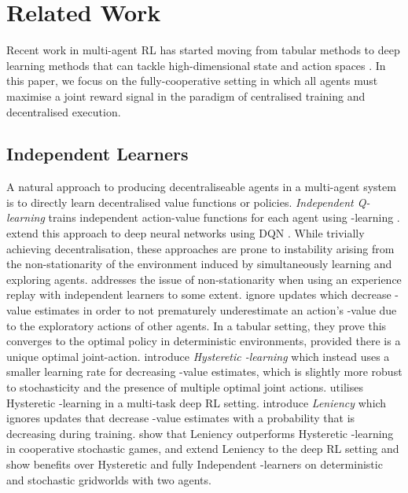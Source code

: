 \documentclass[twoside,11pt]{article}
\renewcommand{\cite}{\citep}
\begin{document}
 \section{Related Work}
\label{sec:related}

Recent work in multi-agent RL has started moving from 
tabular methods \cite{yang_multiagent_2004, busoniu_comprehensive_2008} to deep learning methods that can tackle
high-dimensional state and action spaces \cite{tampuu_multiagent_2015,foerster_counterfactual_2017,peng_multiagent_2017, de_witt_multi-agent_2018}.
In this paper, we 
focus on the fully-cooperative setting in which all agents must maximise a joint reward signal in the paradigm of centralised training and decentralised execution.  

\subsection{Independent Learners}
A natural approach to producing decentraliseable agents in a multi-agent system 
is to directly learn decentralised value functions or policies. 
\emph{Independent Q-learning} \cite{tan_multi-agent_1993} trains independent
action-value functions for each agent using -learning \cite{watkins_learning_1989}. \citet{tampuu_multiagent_2015} extend this approach to 
deep neural networks using DQN \cite{mnih_human-level_2015}.
While trivially achieving decentralisation, these approaches are prone to instability arising from the non-stationarity of the environment induced by simultaneously learning and exploring agents. 
\citet{foerster_stabilising_2017} addresses the issue of non-stationarity when using an experience replay with independent learners to some extent.
\citet{lauer2000algorithm} ignore updates which decrease -value estimates in order to not prematurely underestimate an action's -value due to the exploratory actions of other agents. In a tabular setting, they prove this converges to the optimal policy in deterministic environments, provided there is a unique optimal joint-action.
\citet{matignon2007hysteretic} introduce \textit{Hysteretic -learning} which instead uses a smaller learning rate for decreasing -value estimates, which is slightly more robust to stochasticity and the presence of multiple optimal joint actions. 
\citet{omidshafiei_deep_2017} utilises Hysteretic -learning in a multi-task deep RL setting. 
\citet{panait2008theoretical} introduce \textit{Leniency} which ignores updates that decrease -value estimates with a probability that is decreasing during training. 
\citet{wei2016lenient} show that Leniency outperforms Hysteretic -learning in cooperative stochastic games, and \citet{palmer2018lenient} extend Leniency to the deep RL setting and show benefits over Hysteretic and fully Independent -learners on deterministic and stochastic gridworlds with two agents. 
\end{document}
